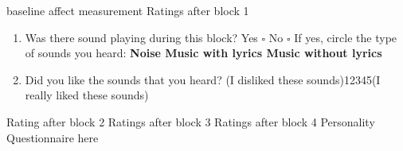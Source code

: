 \documentclass[12pt, a4paper]{article}
\begin{document}
\newpage
baseline affect measurement
\newpage
Ratings after block 1
\begin{enumerate}
\item Was there sound playing during this block? \hspace{12pt} Yes $\square$ No $\square$
\newline If yes, circle the type of sounds you heard:
\newline \textbf{ Noise \hspace{12pt} Music with lyrics \hspace{12pt} Music without lyrics}
\item Did you like the sounds that you heard?
\newline (I disliked these sounds)\hspace{12pt}1\hspace{12pt}2\hspace{12pt}3\hspace{12pt}4\hspace{12pt}5\hspace{12pt}(I really liked these sounds)
\end{enumerate}
\newpage
Rating after block 2
\newpage
Ratings after block 3
\newpage
Ratings after block 4
\newline Personality Questionnaire here
\end{document}
